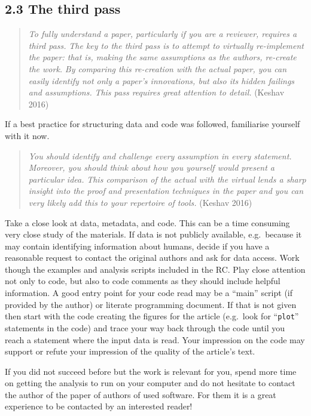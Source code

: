 \documentclass[fleqn,10pt]{wlpeerj} %
\begin{document}
\subsection*{2.3 The third pass}\label{the-third-pass}

\begin{quote}
\emph{To fully understand a paper, particularly if you are a reviewer,
requires a third pass.} \emph{The key to the third pass is to attempt to
virtually re-implement the paper: that is, making the same assumptions
as the authors, re-create the work.} \emph{By comparing this re-creation
with the actual paper, you can easily identify not only a paper's
innovations, but also its hidden failings and assumptions.} \emph{This
pass requires great attention to detail.} (Keshav 2016)
\end{quote}

If a best practice for structuring data and code was followed,
familiarise yourself with it now.

\begin{quote}
\emph{You should identify and challenge every assumption in every
statement.} \emph{Moreover, you should think about how you yourself
would present a particular idea.} \emph{This comparison of the actual
with the virtual lends a sharp insight into the proof and presentation
techniques in the paper and you can very likely add this to your
repertoire of tools.} (Keshav 2016)
\end{quote}

Take a close look at data, metadata, and code. This can be a time
consuming very close study of the materials. If data is not publicly
available, e.g.~because it may contain identifying information about
humans, decide if you have a reasonable request to contact the original
authors and ask for data access. Work though the examples and analysis
scripts included in the RC. Play close attention not only to code, but
also to code comments as they should include helpful information. A good
entry point for your code read may be a ``main'' script (if provided by
the author) or literate programming document. If that is not given then
start with the code creating the figures for the article (e.g.~look for
``\texttt{plot}'' statements in the code) and trace your way back
through the code until you reach a statement where the input data is
read. Your impression on the code may support or refute your impression
of the quality of the article's text.

If you did not succeed before but the work is relevant for you, spend
more time on getting the analysis to run on your computer and do not
hesitate to contact the author of the paper of authors of used software.
For them it is a great experience to be contacted by an interested
reader!
\end{document}
